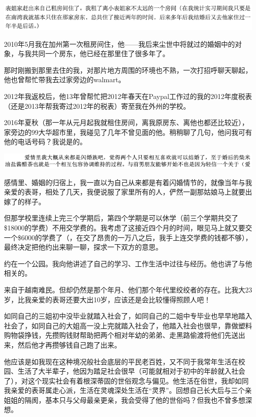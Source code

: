 \documentclass[9pt, b5paper]{article}
\begin{document}
\begin{center}
\includegraphics[width=.9\linewidth]{./pic/backups_plans_20210423_202941.png}
\end{center}

2010年5月我在加州第一次租房间住，他——我后来尘世中将就过的婚姻中的对象，与我共同一个房东，他已经在那里住了很多年了。 

那时刚搬到那里去住的我，对那片地方周围的环境也不熟，一次打招呼聊天聊起，他也曾帮忙带我去过家旁边的walmart。

2012年我返校后，他13年曾帮忙把2012年春天在Paypal工作过的我的2012年度税表（还是2013年帮我寄过2012年的税表）寄至我在外州的学校。

2016年夏秋（那一年从元月起我就租住房间，离我原房东、离他也都还比较近），家旁边的99大华超市里，我碰见了几年不曾见面的他。稍稍聊了几句，他问我可有他的电话号码？我说是的。

\begin{center}
\includegraphics[width=.9\linewidth]{./pic/backups_plans_20210423_203401.png}
\end{center}

感情里、婚姻的归宿上，我一直以为自己从来都是有着闪婚情节的，就像当年与我亲爱的表哥，相处了几天，我便说服了家里所有的人，俨然一副那姑娘马上就要出嫁了的样子。

但那学校里连续上完三个学期后，第四个学期是可以休学（前三个学期共交了\$18000的学费）不用交学费的。我考虑了这接近四个月的时间，眼见马上就又要交一个\$6000的学费了（，在交了昂贵的一万八之后，我手上连交学费的钱都不够），最终决定把他约出来聊一聊，探求一下双方的意思。

约在一个公园。我向他讲述了自己的学习、工作生活中过往与经历。他也讲了与他相关的。 

来自于越南难民。但却仍然是那个年月、他们那个年代里绞绞者的存在。比我大23岁，比我亲爱的表哥还要大出10岁，应该还是会比较懂得照顾人吧！

如同自己的三姐初中没毕业就踏入社会了，如同自己的二姐中专毕业也早早地踏入社会了，如同自己的大姐高一没上完就踏入社会了，他踏入社会也很早，靠做塑料购物袋挣钱，先攒购钱财帮助把两个相对年幼的弟弟、走黑路偷渡将他们先送出来，然后他才再攒够钱自己跑了出来。

他应该是如我现在这种境况般社会底层的平民老百姓，又不同于我常年生活在校园、生活了大半辈子，他因为踏足社会很早（可能就相对于初中的年龄就入社会了），对这个现实社会有着根深蒂固的世俗观念与偏见。他生活在俗世，我却如同我亲爱的表哥属走心派，生活在灵魂深处生活在“灵界”。回想自己长大后与三个亲姐姐的隔阂，基本只与父母最亲更亲，我会受得了他的世俗吗？但我也不曾多想深想。 
\end{document}
